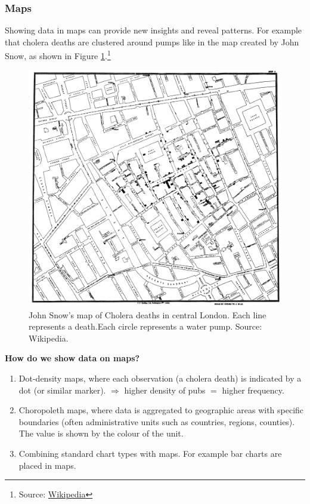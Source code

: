\documentclass[]{book}
\providecommand{\tightlist}{%
  \setlength{\itemsep}{0pt}\setlength{\parskip}{0pt}}
\let\rmarkdownfootnote\footnote%
\def\footnote{\protect\rmarkdownfootnote}
\begin{document}
\hypertarget{maps}{%
\subsubsection{Maps}\label{maps}}

Showing data in maps can provide new insights and reveal patterns. For example that cholera deaths are clustered around pumps like in the map created by John Snow, as shown in Figure \ref{fig:viz155}.\footnote{Source: \href{https://en.wikipedia.org/wiki/John_Snow\#/media/File:Snow-cholera-map-1.jpg}{Wikipedia}}

\begin{figure}

{\centering \includegraphics[width=0.48\linewidth]{_resources/chapter_viz/Snow-cholera-map-1} 

}

\caption{John Snow's map of Cholera deaths in central London. Each line represents a death.Each circle represents a water pump. Source: Wikipedia.}\label{fig:viz155}
\end{figure}

\textbf{How do we show data on maps?}

\begin{enumerate}
\def\labelenumi{\arabic{enumi}.}
\setcounter{enumi}{2}
\tightlist
\item
  Dot-density maps, where each observation (a cholera death) is indicated by a dot (or similar marker). \(\Rightarrow\) higher density of pubs \(=\) higher frequency.
\item
  Choropoleth maps, where data is aggregated to geographic areas with specific boundaries (often administrative units such as countries, regions, counties). The value is shown by the colour of the unit.
\item
  Combining standard chart types with maps. For example bar charts are placed in maps.
\end{enumerate}
\end{document}
